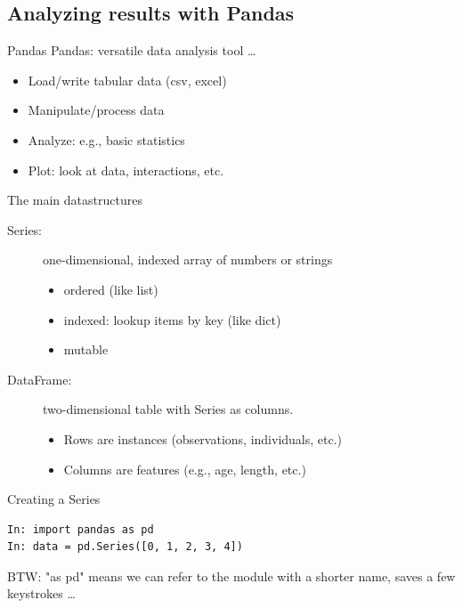 \documentclass{beamer}
\begin{document}




\subsection{Analyzing results with Pandas}
\begin{frame}{Pandas}
    Pandas: versatile data analysis tool \dots

    \begin{itemize}
        \item Load/write tabular data (csv, excel)
        \item Manipulate/process data
        \item Analyze: e.g., basic statistics
        \item Plot: look at data, interactions, etc.
    \end{itemize}
\end{frame}

\begin{frame}{The main datastructures}
    \begin{description}
        \item[Series:] one-dimensional, indexed array of numbers or strings
            \begin{itemize}
                \item ordered (like list)
                \item indexed: lookup items by key (like dict)
                \item mutable
            \end{itemize}
        \item[DataFrame:] two-dimensional table with Series as columns.
            \begin{itemize}
                \item Rows are instances (observations, individuals, etc.)
                \item Columns are features (e.g., age, length, etc.)
            \end{itemize}
    \end{description}
\end{frame}

\begin{frame}[fragile]{Creating a Series}
\begin{lstlisting}
In: import pandas as pd
In: data = pd.Series([0, 1, 2, 3, 4])
\end{lstlisting}

\vspace{1em}
BTW: "as pd" means we can refer to the module with a shorter name,
saves a few keystrokes \dots
\end{frame}
\end{document}
